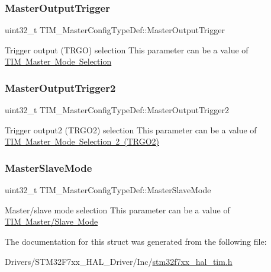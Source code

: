 \subsubsection{\texorpdfstring{MasterOutputTrigger}{MasterOutputTrigger}}
{\footnotesize\ttfamily uint32\+\_\+t T\+I\+M\+\_\+\+Master\+Config\+Type\+Def\+::\+Master\+Output\+Trigger}

Trigger output (T\+R\+GO) selection This parameter can be a value of \mbox{\hyperlink{group___t_i_m___master___mode___selection}{T\+IM Master Mode Selection}} \mbox{\label{struct_t_i_m___master_config_type_def_a5c9db1837051b5b2927bc4d726e980fe}} 
\subsubsection{\texorpdfstring{MasterOutputTrigger2}{MasterOutputTrigger2}}
{\footnotesize\ttfamily uint32\+\_\+t T\+I\+M\+\_\+\+Master\+Config\+Type\+Def\+::\+Master\+Output\+Trigger2}

Trigger output2 (T\+R\+G\+O2) selection This parameter can be a value of \mbox{\hyperlink{group___t_i_m___master___mode___selection__2}{T\+IM Master Mode Selection 2 (T\+R\+G\+O2)}} \mbox{\label{struct_t_i_m___master_config_type_def_a45ddfca310a1180e19fc24b36f8e9585}} 
\subsubsection{\texorpdfstring{MasterSlaveMode}{MasterSlaveMode}}
{\footnotesize\ttfamily uint32\+\_\+t T\+I\+M\+\_\+\+Master\+Config\+Type\+Def\+::\+Master\+Slave\+Mode}

Master/slave mode selection This parameter can be a value of \mbox{\hyperlink{group___t_i_m___master___slave___mode}{T\+IM Master/\+Slave Mode}} 

The documentation for this struct was generated from the following file\+:\begin{DoxyCompactItemize}
\item 
Drivers/\+S\+T\+M32\+F7xx\+\_\+\+H\+A\+L\+\_\+\+Driver/\+Inc/\mbox{\hyperlink{stm32f7xx__hal__tim_8h}{stm32f7xx\+\_\+hal\+\_\+tim.\+h}}\end{DoxyCompactItemize}
